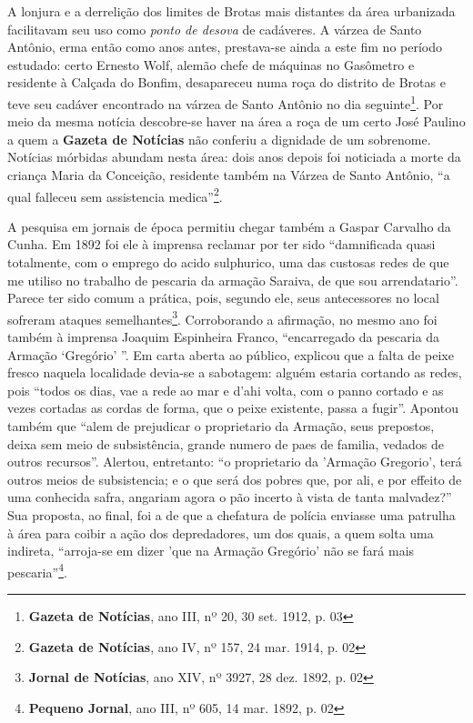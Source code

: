 A lonjura e a derrelição dos limites de Brotas mais distantes da área urbanizada facilitavam seu uso como \textit{ponto de desova} de cadáveres. A várzea de Santo Antônio, erma então como anos antes, prestava-se ainda a este fim no período estudado: certo Ernesto Wolf, alemão chefe de máquinas no Gasômetro e residente à Calçada do Bonfim, desapareceu numa roça do distrito de Brotas e teve seu cadáver encontrado na várzea de Santo Antônio no dia seguinte\footnote{\textbf{Gazeta de Notícias}, ano III, nº 20, 30 set. 1912, p. 03}. Por meio da mesma notícia descobre-se haver na área a roça de um certo José Paulino a quem a \textbf{Gazeta de Notícias} não conferiu a dignidade de um sobrenome. Notícias mórbidas abundam nesta área: dois anos depois foi noticiada a morte da criança Maria da Conceição, residente também na Várzea de Santo Antônio, ``a qual falleceu sem assistencia medica''\footnote{\textbf{Gazeta de Notícias}, ano IV, nº 157, 24 mar. 1914, p. 02}.

A pesquisa em jornais de época permitiu chegar também a Gaspar Carvalho da Cunha. Em 1892 foi ele à imprensa reclamar por ter sido ``damnificada quasi totalmente, com o emprego do acido sulphurico, uma das custosas redes de que me utiliso no trabalho de pescaria da armação Saraiva, de que sou arrendatario''. Parece ter sido comum a prática, pois, segundo ele, seus antecessores no local sofreram ataques semelhantes\footnote{\textbf{Jornal de Notícias}, ano XIV, nº 3927, 28 dez. 1892, p. 02}. Corroborando a afirmação, no mesmo ano foi também à imprensa Joaquim Espinheira Franco, ``encarregado da pescaria da Armação `Gregório' ''. Em carta aberta ao público, explicou que a falta de peixe fresco naquela localidade devia-se a sabotagem: alguém estaria cortando as redes, pois ``todos os dias, vae a rede ao mar e d'ahi volta, com o panno cortado e as vezes cortadas as cordas de forma, que o peixe existente, passa a fugir''. Apontou também que ``alem de prejudicar o proprietario da Armação, seus prepostos, deixa sem meio de subsistência, grande numero de paes de familia, vedados de outros recursos''. Alertou, entretanto: ``o proprietario da 'Armação Gregorio', terá outros meios de subsistencia; e o que será dos pobres que, por ali, e por effeito de uma conhecida safra, angariam agora o pão incerto à vista de tanta malvadez?'' Sua proposta, ao final, foi a de que a chefatura de polícia enviasse uma patrulha à área para coibir a ação dos depredadores, um dos quais, a quem solta uma indireta, ``arroja-se em dizer 'que na Armação Gregório' não se fará mais pescaria''\footnote{\textbf{Pequeno Jornal}, ano III, nº 605, 14 mar. 1892, p. 02}.



